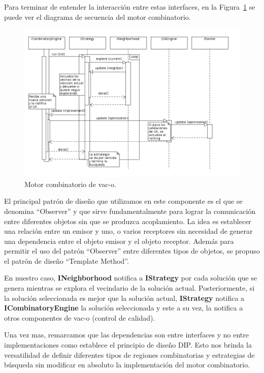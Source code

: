 Para terminar de entender la interacci\'on entre estas interfaces, en la
Figura~\ref{motor} se puede ver el diagrama de secuencia del motor combinatorio.

\begin{figure} 
  \centering
  \includegraphics[scale=0.45]{sequence.png}
  \caption{Motor combinatorio de vac-o.}
\label{motor}
\end{figure}

El principal patr\'on de dise\~no que utilizamos en este componente es el que
se denomina ``Observer'' y que sirve fundamentalmente para lograr la
comunicaci\'on entre diferentes objetos sin que se produzca acoplamiento. La
idea es establecer una relaci\'on entre un emisor y uno, o varios receptores
sin necesidad de generar una dependencia entre el objeto emisor y el objeto
receptor. Adem\'as para permitir el uso del patr\'on ``Observer'' entre
diferentes tipos de objetos, se propuso el patr\'on de dise\~no ``Template
Method''.

En nuestro caso, \textbf{INeighborhood} notifica a \textbf{IStrategy} por cada
soluci\'on que se genera mientras se explora el vecindario de la soluci\'on
actual. Posteriormente, si la soluci\'on seleccionada es mejor que la soluci\'on
actual, \textbf{IStrategy} notifica a \textbf{ICombinatoryEngine} la soluci\'on
seleccionada y este a su vez, la notifica a otros componentes de \ac{vac-o}
(control de calidad).

Una vez mas, remarcamos que las dependencias son entre interfaces y no entre
implementaciones como establece el principio de dise\~no \ac{DIP}. Esto nos
brinda la versatilidad de definir diferentes tipos de regiones combinatorias y
estrategias de b\'usqueda sin modificar en absoluto la implementaci\'on del
motor combinatorio.